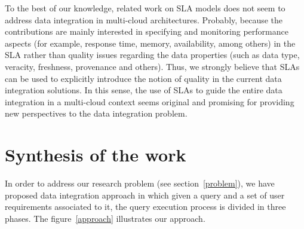 To the best of our knowledge, related work on SLA models does not seem to 
address data integration in multi-cloud architectures. Probably, because the 
contributions are mainly interested in specifying and monitoring performance 
aspects (for example, response time, memory, availability, among others) in the SLA 
rather than quality issues regarding the data properties (such as data type, 
veracity, freshness, provenance and others).
Thus, we strongly believe that SLAs can be used to explicitly introduce the 
notion of quality in the current data integration solutions. 
In this sense, the use of SLAs to guide the entire data integration in a 
multi-cloud context seems original and promising for providing new perspectives to the data integration problem.




\section{Synthesis of the work}

In order to address our research problem (see section~\ref{problem}), we have proposed data integration approach in which given a query and a set of user requirements associated to it, the query execution process is divided in three phases. The figure~\ref{approach} illustrates our approach.


	
